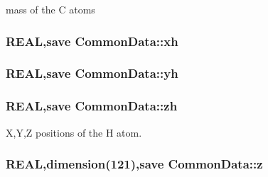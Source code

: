 mass of the C atoms \hypertarget{namespace_common_data_a54cf378ece8175fe01e142e009cefd6a}{
\subsubsection[{xh}]{\setlength{\rightskip}{0pt plus 5cm}REAL,save {\bf CommonData::xh}}}
\label{namespace_common_data_a54cf378ece8175fe01e142e009cefd6a}
\hypertarget{namespace_common_data_aefaa9a9c076fac8257c87df0ac2c3f08}{
\subsubsection[{yh}]{\setlength{\rightskip}{0pt plus 5cm}REAL,save {\bf CommonData::yh}}}
\label{namespace_common_data_aefaa9a9c076fac8257c87df0ac2c3f08}
\hypertarget{namespace_common_data_af47bf8216990a30ef0b9c34a3259fa83}{
\subsubsection[{zh}]{\setlength{\rightskip}{0pt plus 5cm}REAL,save {\bf CommonData::zh}}}
\label{namespace_common_data_af47bf8216990a30ef0b9c34a3259fa83}


X,Y,Z positions of the H atom. \hypertarget{namespace_common_data_a449fb6ff43ccc84909d922ac55097b87}{
\subsubsection[{z}]{\setlength{\rightskip}{0pt plus 5cm}REAL,dimension(121),save {\bf CommonData::z}}}
\label{namespace_common_data_a449fb6ff43ccc84909d922ac55097b87}


